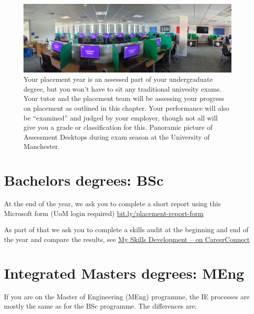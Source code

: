 \documentclass[
]{book}
\begin{document}
\begin{figure}

{\centering \includegraphics[width=1\linewidth]{images/assessment} 

}

\caption{Your placement year is an assessed part of your undergraduate degree, but you won't have to sit any traditional univesity exams. Your tutor and the placement team will be assessing your progress on placement as outlined in this chapter. Your performance will also be ``examined'' and judged by your employer, though not all will give you a grade or classification for this. Panoramic picture of Assessment Desktops during exam season at the University of Manchester.}\label{fig:assessment-fig}
\end{figure}



\section{Bachelors degrees: BSc}\label{bsc}

At the end of the year, we ask you to complete a short report using this Microsoft form (UoM login required) \href{https://bit.ly/placement-report-form}{bit.ly/placement-report-form}

As part of that we ask you to complete a skills audit at the beginning and end of the year and compare the results, see \href{https://www.careers.manchester.ac.uk/options/skills/myskills}{My Skills Development -- on CareerConnect} \citep{audit}

\section{Integrated Masters degrees: MEng}\label{meng}

If you are on the Master of Engineering (MEng) programme, the IE processes are mostly the same as for the BSc programme. The differences are:
\end{document}
